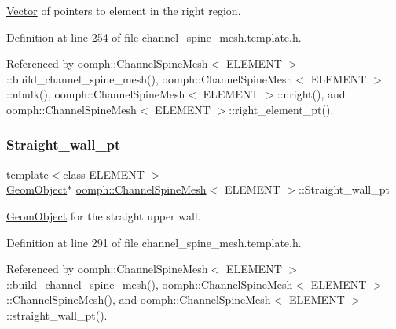 \hyperlink{classoomph_1_1Vector}{Vector} of pointers to element in the right region. 



Definition at line 254 of file channel\+\_\+spine\+\_\+mesh.\+template.\+h.



Referenced by oomph\+::\+Channel\+Spine\+Mesh$<$ E\+L\+E\+M\+E\+N\+T $>$\+::build\+\_\+channel\+\_\+spine\+\_\+mesh(), oomph\+::\+Channel\+Spine\+Mesh$<$ E\+L\+E\+M\+E\+N\+T $>$\+::nbulk(), oomph\+::\+Channel\+Spine\+Mesh$<$ E\+L\+E\+M\+E\+N\+T $>$\+::nright(), and oomph\+::\+Channel\+Spine\+Mesh$<$ E\+L\+E\+M\+E\+N\+T $>$\+::right\+\_\+element\+\_\+pt().

\mbox{\label{classoomph_1_1ChannelSpineMesh_a34f4583f2aa944d5d1ff723f6a4123bf}} 
\subsubsection{\texorpdfstring{Straight\+\_\+wall\+\_\+pt}{Straight\_wall\_pt}}
{\footnotesize\ttfamily template$<$class E\+L\+E\+M\+E\+NT $>$ \\
\hyperlink{classoomph_1_1GeomObject}{Geom\+Object}$\ast$ \hyperlink{classoomph_1_1ChannelSpineMesh}{oomph\+::\+Channel\+Spine\+Mesh}$<$ E\+L\+E\+M\+E\+NT $>$\+::Straight\+\_\+wall\+\_\+pt\hspace{0.3cm}{\ttfamily [protected]}}



\hyperlink{classoomph_1_1GeomObject}{Geom\+Object} for the straight upper wall. 



Definition at line 291 of file channel\+\_\+spine\+\_\+mesh.\+template.\+h.



Referenced by oomph\+::\+Channel\+Spine\+Mesh$<$ E\+L\+E\+M\+E\+N\+T $>$\+::build\+\_\+channel\+\_\+spine\+\_\+mesh(), oomph\+::\+Channel\+Spine\+Mesh$<$ E\+L\+E\+M\+E\+N\+T $>$\+::\+Channel\+Spine\+Mesh(), and oomph\+::\+Channel\+Spine\+Mesh$<$ E\+L\+E\+M\+E\+N\+T $>$\+::straight\+\_\+wall\+\_\+pt().

\mbox{\label{classoomph_1_1ChannelSpineMesh_adaa23badd05b69c905b444bd9141b3a7}} 
